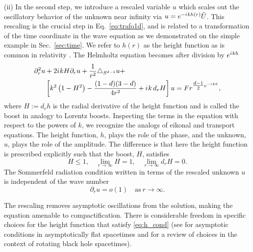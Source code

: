 \documentclass[final,onefignum,onetabnum]{siamart190516}
\newcommand{\iu}{{i\mkern1mu}}
\begin{document}
(ii) In the second step, we introduce a rescaled variable $u$ which scales out the oscillatory behavior of the unknown near infinity via $u=e^{-\iu k h(r)} \tilde{U}$. This rescaling is the crucial step in Eq.~\eqref{eq:trafo1d}, and is related to a transformation of the time coordinate in the wave equation \cite{ZengFramework} as we demonstrated on the simple example in Sec.~\ref{sec:time}. We refer to $h(r)$ as the height function as is common in relativity \cite{reinhart1973maximal, beig1996vacuum}. The Helmholtz equation becomes after division by $e^{\iu k h}$
\begin{align*}
	\partial_r^2 u & + 2 \iu k H \partial_r u + \frac{1}{r^2}\triangle_{S^{d-1}} u +                                        \\
	        & \left[k^2 \left(1- H^2\right) - \frac{(1-d)(3-d)}{4 r^2} + \iu k \, d_r H \right] u = F r^{\tfrac{d-1}{2} e^{-\iu k h}},
\end{align*}
where $H:=d_r h$ is the radial derivative of the height function and is called the boost in analogy to Lorentz boosts. Inspecting the terms in the equation with respect to the powers of $k$, we recognize the analogs of eikonal and transport equations. The height function, $h$, plays the role of the phase, and the unknown, $u$, plays the role of the amplitude. The difference is that here the height function is prescribed explicitly such that the boost, $H$, satisfies \cite{Zenginoglu08, ZengFramework, jaramillo2021pseudospectrum}
\begin{equation} \label{eq:h_cond}
	H \leq 1, \quad \lim_{r\to\infty} H = 1, \quad \lim_{r\to\infty} d_r H = 0. %
\end{equation}
The Sommerfeld radiation condition written in terms of the rescaled unknown $u$ is independent of the wave number
\[ \partial_r u = o(1) \quad \mathrm{as} \ r\to\infty. \]

The rescaling removes asymptotic oscillations from the solution, making the equation amenable to compactification. There is considerable freedom in specific choices for the height function that satisfy \eqref{eq:h_cond} (see \cite{Zenginoglu08} for asymptotic conditions in asymptotically flat spacetimes and \cite{Macedo_2020} for a review of choices in the context of rotating black hole spacetimes). 
\end{document}
